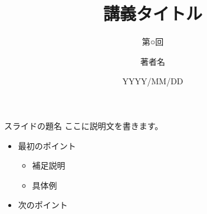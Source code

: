 \documentclass[12pt,aspectratio=43]{beamer}
\title{講義タイトル}
\subtitle{第○回}
\author{著者名}
\date{YYYY/MM/DD}
\begin{document}
\begin{frame}[t,noframenumbering]
  \titlepage
\end{frame}

\begin{frame}{スライドの題名}
  ここに説明文を書きます。

  \begin{itemize}
    \item 最初のポイント
      \begin{itemize}
        \item 補足説明
        \item 具体例
      \end{itemize}
    \item 次のポイント
  \end{itemize}
\end{frame}
\end{document}
